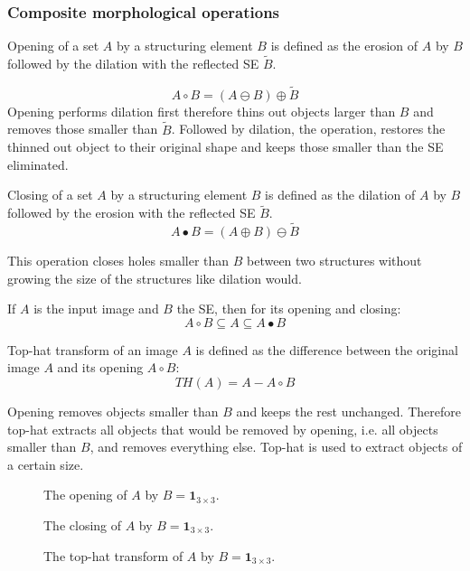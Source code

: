 \documentclass[a4paper]{article}
\begin{document}
\subsubsection{Composite morphological operations}
\begin{definition}
Opening of a set $A$ by a structuring element $B$ is defined as
the erosion of $A$ by $B$ followed by the dilation with the reflected
SE $\tilde{B}$.
\end{definition}
\begin{equation}
   A \circ B = \left( A \ominus B \right) \oplus \tilde{B} 
\end{equation}
Opening performs dilation first therefore thins out objects larger than $B$ and removes those smaller than $\tilde{B}$. Followed by dilation, the operation, restores the thinned out object to their original shape and keeps those smaller than the SE eliminated.

\begin{definition}
Closing of a set $A$ by a structuring element $B$ is defined as the
dilation of $A$ by $B$ followed by the erosion with the reflected SE $\tilde{B}$.
\begin{equation}
    A \bullet B = \left( A \oplus B \right) \ominus \tilde{B} 
\end{equation}
\end{definition}
This operation closes holes smaller than $B$ between two structures without growing the size of the structures like dilation would.
\begin{corollary}
If $A$ is the input image and $B$ the SE, then for  its opening and closing:
\[
A \circ B \subseteq A \subseteq A \bullet B
\]
\end{corollary}


\begin{definition}
Top-hat transform of an image $A$ is defined as the
difference between the original image $A$ and its opening $A \circ B$:
\begin{equation}
    TH(A) = A - A \circ B
\end{equation}


\end{definition}
Opening removes objects smaller than $B$ and keeps the rest unchanged. Therefore top-hat extracts all objects that would be removed by opening, i.e. all objects smaller than $B$, and removes everything else. Top-hat is used to extract objects of a certain size.

\begin{multicols}{3}
\begin{figure}[H]
    \centering
    
    \caption{The opening of $A$ by $B=\textbf{1}_{3\times 3}$.}
\end{figure}
\begin{figure}[H]
    \centering
    
    \caption{The closing of $A$ by $B=\textbf{1}_{3\times 3}$.}
\end{figure}
\begin{figure}[H]
    \centering
    
    \caption{The top-hat transform of $A$ by $B=\textbf{1}_{3\times 3}$.}
\end{figure}
\end{multicols}
\end{document}
